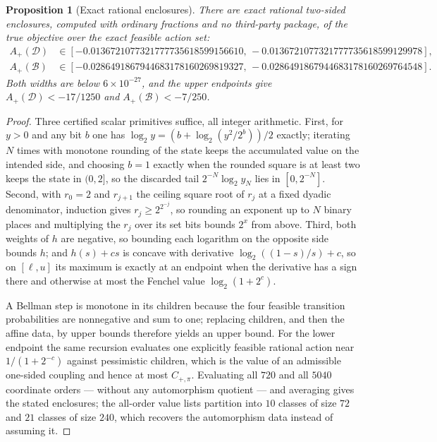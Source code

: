 \documentclass[11pt]{article}
\newtheorem{proposition}[theorem]{Proposition}
\theoremstyle{remark}
\newcommand{\B}{\mathcal B}
\begin{document}
\begin{proposition}[Exact rational enclosures]
There are exact rational two-sided enclosures, computed with ordinary
fractions and no third-party package, of the true objective over the exact
feasible action set:
\begin{align}
 A_+(\mathcal D)&\in[-0.0136721077321777735618599156610,\,
  -0.0136721077321777735618599129978],\\
 A_+(\B)&\in[-0.0286491867944683178160269819327,\,
  -0.0286491867944683178160269764548].
\end{align}
Both widths are below $6\times10^{-27}$, and the upper endpoints give
$A_+(\mathcal D)<-17/1250$ and $A_+(\B)<-7/250$.
\label{prop:rational}
\end{proposition}
\begin{proof}
Three certified scalar primitives suffice, all integer arithmetic.  First, for
$y>0$ and any bit $b$ one has $\log_2y=(b+\log_2(y^2/2^{b}))/2$ exactly;
iterating $N$ times with monotone rounding of the state keeps the accumulated
value on the intended side, and choosing $b=1$ exactly when the rounded square
is at least two keeps the state in $(0,2]$, so the discarded tail
$2^{-N}\log_2y_N$ lies in $[0,2^{-N}]$.  Second, with $r_0=2$ and
$r_{j+1}$ the ceiling square root of $r_j$ at a fixed dyadic denominator,
induction gives $r_j\ge2^{2^{-j}}$, so rounding an exponent up to $N$ binary
places and multiplying the $r_j$ over its set bits bounds $2^x$ from above.
Third, both weights of $h$ are negative, so bounding each logarithm on the
opposite side bounds $h$; and $h(s)+cs$ is concave with derivative
$\log_2((1-s)/s)+c$, so on $[\ell,u]$ its maximum is exactly at an endpoint
when the derivative has a sign there and otherwise at most the Fenchel value
$\log_2(1+2^{c})$.

A Bellman step is monotone in its children because the four feasible
transition probabilities are nonnegative and sum to one; replacing children,
and then the affine data, by upper bounds therefore yields an upper bound.  For
the lower endpoint the same recursion evaluates one explicitly feasible
rational action near $1/(1+2^{-c})$ against pessimistic children, which is the
value of an admissible one-sided coupling and hence at most $C_{+,\pi}$.
Evaluating all $720$ and all $5040$ coordinate orders — without any
automorphism quotient — and averaging gives the stated enclosures; the
all-order value lists partition into $10$ classes of size $72$ and $21$ classes
of size $240$, which recovers the automorphism data instead of assuming it.
\end{proof}
\end{document}
